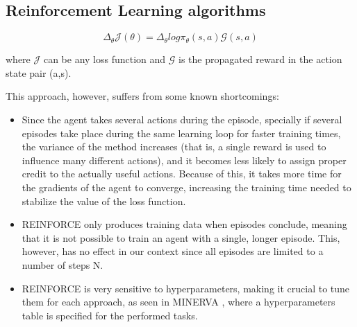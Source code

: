 \subsection{Reinforcement Learning algorithms}
\label{sec:RLalgorithms}



\begin{equation}
\label{eq:reinforce}
    \Delta_{\theta}\mathcal{J}(\theta) =\Delta_{\theta}log\pi_{\theta}(s,a)\mathcal{G}(s,a) 
\end{equation}

where $\mathcal{J}$ can be any loss function and $\mathcal{G}$ is the propagated reward in the action state pair (a,s).

This approach, however, suffers from some known shortcomings:
\begin{itemize}
    \item {Since the agent takes several actions during the episode, specially if several episodes take place during the same learning loop for faster training times, the variance of the method increases (that is, a single reward is used to influence many different actions), and it becomes less likely to assign proper credit to the actually useful actions. Because of this, it takes more time for the gradients of the agent to converge, increasing the training time needed to stabilize the value of the loss function.}
    \item {REINFORCE only produces training data when episodes conclude, meaning that it is not possible to train an agent with a single, longer episode. This, however, has no effect in our context since all episodes are limited to a number of steps N.}
    \item {REINFORCE is very sensitive to hyperparameters, making it crucial to tune them for each approach, as seen in MINERVA
    , where a hyperparameters table is specified for the performed tasks.}
\end{itemize}

